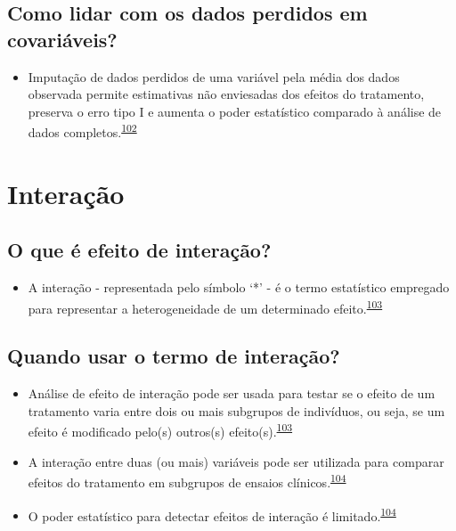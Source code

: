 \documentclass[
]{book}
\providecommand{\tightlist}{%
  \setlength{\itemsep}{0pt}\setlength{\parskip}{0pt}}
\begin{document}
\hypertarget{como-lidar-com-os-dados-perdidos-em-covariuxe1veis}{%
\subsection{Como lidar com os dados perdidos em covariáveis?}\label{como-lidar-com-os-dados-perdidos-em-covariuxe1veis}}

\begin{itemize}
\tightlist
\item
  Imputação de dados perdidos de uma variável pela média dos dados observada permite estimativas não enviesadas dos efeitos do tratamento, preserva o erro tipo I e aumenta o poder estatístico comparado à análise de dados completos.\textsuperscript{\protect\hyperlink{ref-Kahan2014}{102}}
\end{itemize}

\hypertarget{interacao}{%
\section{Interação}\label{interacao}}

\hypertarget{o-que-uxe9-efeito-de-interauxe7uxe3o}{%
\subsection{O que é efeito de interação?}\label{o-que-uxe9-efeito-de-interauxe7uxe3o}}

\begin{itemize}
\tightlist
\item
  A interação - representada pelo símbolo `*' - é o termo estatístico empregado para representar a heterogeneidade de um determinado efeito.\textsuperscript{\protect\hyperlink{ref-Altman1996}{103}}
\end{itemize}

\hypertarget{quando-usar-o-termo-de-interauxe7uxe3o}{%
\subsection{Quando usar o termo de interação?}\label{quando-usar-o-termo-de-interauxe7uxe3o}}

\begin{itemize}
\item
  Análise de efeito de interação pode ser usada para testar se o efeito de um tratamento varia entre dois ou mais subgrupos de indivíduos, ou seja, se um efeito é modificado pelo(s) outros(s) efeito(s).\textsuperscript{\protect\hyperlink{ref-Altman1996}{103}}
\item
  A interação entre duas (ou mais) variáveis pode ser utilizada para comparar efeitos do tratamento em subgrupos de ensaios clínicos.\textsuperscript{\protect\hyperlink{ref-Altman2003}{104}}
\item
  O poder estatístico para detectar efeitos de interação é limitado.\textsuperscript{\protect\hyperlink{ref-Altman2003}{104}}
\end{itemize}
\end{document}
